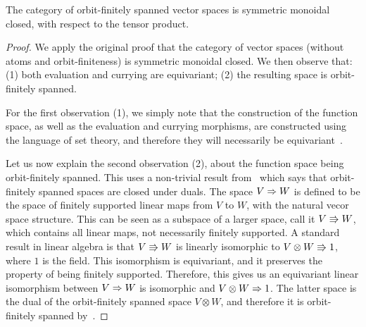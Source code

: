 \begin{theorem}\label{thm:orbit-finite-vector-space-closed} The category of orbit-finitely spanned vector spaces is symmetric monoidal closed, with respect to the tensor product.
\end{theorem}
\begin{proof} We apply the original proof that the category of vector spaces (without atoms and orbit-finiteness) is symmetric monoidal closed. We then observe that: (1) both evaluation and currying are equivariant; (2) the resulting space is orbit-finitely spanned. 
    
    For the first observation (1), we simply note that the construction of the function space, as well as  the evaluation and currying morphisms, are constructed using the language of set theory, and therefore they will necessarily be equivariant~\cite[Equivariance Principle]{bojanczyk_slightly2018}.

    Let us now explain the second observation (2), about the function space being orbit-finitely spanned. This uses a non-trivial result from~\cite{bojanczykKM21OrbitFiniteVector} which says that orbit-finitely spanned spaces are closed under duals. 
    The space $V \Rightarrow W$ is defined to be the space of finitely supported linear maps from $V$ to $W$, with the natural vecor space structure. This can be seen as a subspace of a larger space, call it $V \Rrightarrow W$, which contains all linear maps, not necessarily finitely supported. A standard result in linear algebra is that $V \Rrightarrow W$ is linearly isomorphic to $ V \otimes W \Rrightarrow 1$, where $1$ is the field. This isomorphism is equivariant, and it preserves the property of being finitely supported. Therefore, this gives us an equivariant linear isomorphism between $V \Rightarrow W$ is isomorphic and $ V \otimes W \Rightarrow 1$. The latter space is the dual of the orbit-finitely spanned space $V \otimes W$, and therefore it is orbit-finitely spanned by~\cite[Corollary VI.5]{bojanczykKM21OrbitFiniteVector}.
\end{proof}

